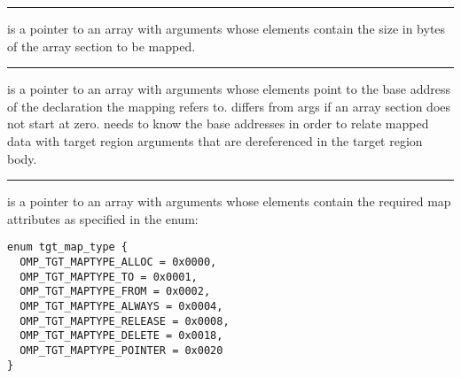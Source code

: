 \noindent\rule{\textwidth}{0.4pt}

 is a pointer to an array with  arguments whose elements contain the size in bytes of the array section to be mapped.

\noindent\rule{\textwidth}{0.4pt}

 is a pointer to an array with  arguments whose elements point to the base address of the declaration the mapping refers to.  differs from args if an array section does not start at zero. \libomptarget{} needs to know the base addresses in order to relate mapped data with target region arguments that are dereferenced in the target region body.

\noindent\rule{\textwidth}{0.4pt}

 is a pointer to an array with  arguments whose elements contain the required map attributes as specified in the enum:
\begin{lstlisting}
enum tgt_map_type {
  OMP_TGT_MAPTYPE_ALLOC = 0x0000,
  OMP_TGT_MAPTYPE_TO = 0x0001,
  OMP_TGT_MAPTYPE_FROM = 0x0002,
  OMP_TGT_MAPTYPE_ALWAYS = 0x0004,
  OMP_TGT_MAPTYPE_RELEASE = 0x0008,
  OMP_TGT_MAPTYPE_DELETE = 0x0018,
  OMP_TGT_MAPTYPE_POINTER = 0x0020
}
\end{lstlisting}

